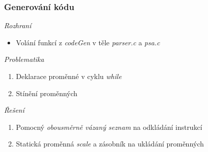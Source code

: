 

\begin{frame}
  \frametitle{Generování kódu}
    \emph{Rozhraní}
    \begin{itemize}
        \item Volání funkcí z \textit{codeGen} v těle \textit{parser.c} a \textit{psa.c}
    \end{itemize}
    \emph{Problematika}
    \begin{enumerate}
        \item Deklarace proměnné v cyklu \textit{while}
        \item Stínění proměnných
    \end{enumerate}
    \emph{Řešení}
    \begin{enumerate}
        \item Pomocný \textit{obousměrně vázaný seznam} na odkládání instrukcí
        \item Statická proměnná \textit{scale} a zásobník na ukládání proměnných
    \end{enumerate}
\end{frame}



